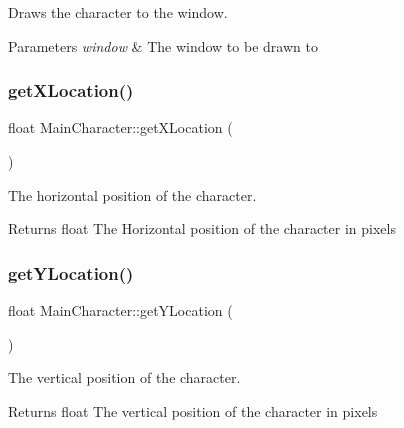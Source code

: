 Draws the character to the window. 


\begin{DoxyParams}{Parameters}
{\em window} & The window to be drawn to \\
\hline
\end{DoxyParams}
\mbox{\label{classMainCharacter_a48c6e280e68d400e3eeac2f33fb194ff}} 
\subsubsection{\texorpdfstring{getXLocation()}{getXLocation()}}
{\footnotesize\ttfamily float Main\+Character\+::get\+X\+Location (\begin{DoxyParamCaption}{ }\end{DoxyParamCaption})}



The horizontal position of the character. 

\begin{DoxyReturn}{Returns}
float The Horizontal position of the character in pixels 
\end{DoxyReturn}
\mbox{\label{classMainCharacter_aa802ffc7d85805d5dffc4d3700fcee7d}} 
\subsubsection{\texorpdfstring{getYLocation()}{getYLocation()}}
{\footnotesize\ttfamily float Main\+Character\+::get\+Y\+Location (\begin{DoxyParamCaption}{ }\end{DoxyParamCaption})}



The vertical position of the character. 

\begin{DoxyReturn}{Returns}
float The vertical position of the character in pixels 
\end{DoxyReturn}
\mbox{\label{classMainCharacter_a368e365aac35d854a4e156470f94ed0e}} 
